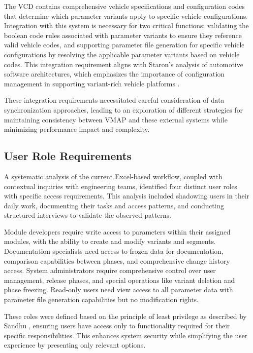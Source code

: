 The \ac{VCD} contains comprehensive vehicle specifications and configuration codes that determine which parameter variants apply to specific vehicle configurations. Integration with this system is necessary for two critical functions: validating the boolean code rules associated with parameter variants to ensure they reference valid vehicle codes, and supporting parameter file generation for specific vehicle configurations by resolving the applicable parameter variants based on vehicle codes. This integration requirement aligns with Staron's analysis of automotive software architectures, which emphasizes the importance of configuration management in supporting variant-rich vehicle platforms \cite{staron2021automotive}.

These integration requirements necessitated careful consideration of data synchronization approaches, leading to an exploration of different strategies for maintaining consistency between \ac{VMAP} and these external systems while minimizing performance impact and complexity.

\subsection{User Role Requirements}
\label{subsec:user-role-requirements}

A systematic analysis of the current Excel-based workflow, coupled with contextual inquiries with engineering teams, identified four distinct user roles with specific access requirements. This analysis included shadowing users in their daily work, documenting their tasks and access patterns, and conducting structured interviews to validate the observed patterns.

Module developers require write access to parameters within their assigned modules, with the ability to create and modify variants and segments. Documentation specialists need access to frozen data for documentation, comparison capabilities between phases, and comprehensive change history access. System administrators require comprehensive control over user management, release phases, and special operations like variant deletion and phase freezing. Read-only users need view access to all parameter data with parameter file generation capabilities but no modification rights.

These roles were defined based on the principle of least privilege as described by Sandhu \cite{sandhu1998role}, ensuring users have access only to functionality required for their specific responsibilities. This enhances system security while simplifying the user experience by presenting only relevant options.


